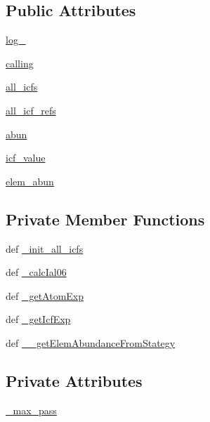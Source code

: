 \subsection*{Public Attributes}
\begin{DoxyCompactItemize}
\item 
\hyperlink{classpyneb_1_1core_1_1icf_1_1_i_c_f_a50ae74d7192ec52a1249a675f963461e}{log\-\_\-}
\item 
\hyperlink{classpyneb_1_1core_1_1icf_1_1_i_c_f_aaeb9b3827ef557a32b109baef31da77f}{calling}
\item 
\hyperlink{classpyneb_1_1core_1_1icf_1_1_i_c_f_a854ee87a53feb102e429e902227ce88b}{all\-\_\-icfs}
\item 
\hyperlink{classpyneb_1_1core_1_1icf_1_1_i_c_f_a9777abc7cc843cd5c4d8c5810c1b2ed1}{all\-\_\-icf\-\_\-refs}
\item 
\hyperlink{classpyneb_1_1core_1_1icf_1_1_i_c_f_a16f31533c8f77e2b08988b22df5317b1}{abun}
\item 
\hyperlink{classpyneb_1_1core_1_1icf_1_1_i_c_f_a9dedc0eb2ad90ea08b8be9984e2d832b}{icf\-\_\-value}
\item 
\hyperlink{classpyneb_1_1core_1_1icf_1_1_i_c_f_a59ea6760bd6a09a66dc47b47bcec55c0}{elem\-\_\-abun}
\end{DoxyCompactItemize}
\subsection*{Private Member Functions}
\begin{DoxyCompactItemize}
\item 
def \hyperlink{classpyneb_1_1core_1_1icf_1_1_i_c_f_a876a93732ddd09b3551fd7a426b317d3}{\-\_\-init\-\_\-all\-\_\-icfs}
\item 
def \hyperlink{classpyneb_1_1core_1_1icf_1_1_i_c_f_ad5be47170b8a6f32e86d88499dba4803}{\-\_\-calc\-Ial06}
\item 
def \hyperlink{classpyneb_1_1core_1_1icf_1_1_i_c_f_a588c7f9f7fe76e06d5152b78788a6059}{\-\_\-get\-Atom\-Exp}
\item 
def \hyperlink{classpyneb_1_1core_1_1icf_1_1_i_c_f_a247f123a65d0150ba0de11e0a7756e4b}{\-\_\-get\-Icf\-Exp}
\item 
def \hyperlink{classpyneb_1_1core_1_1icf_1_1_i_c_f_adb36fd35be4adf2410376f184449fcdb}{\-\_\-\-\_\-get\-Elem\-Abundance\-From\-Stategy}
\end{DoxyCompactItemize}
\subsection*{Private Attributes}
\begin{DoxyCompactItemize}
\item 
\hyperlink{classpyneb_1_1core_1_1icf_1_1_i_c_f_a994574a4b1fff9d0700fb483dabc8238}{\-\_\-max\-\_\-pass}
\end{DoxyCompactItemize}


